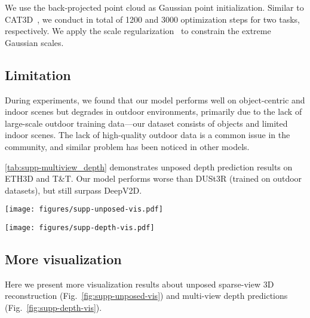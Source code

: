 We use the back-projected point cloud as Gaussian point initialization. Similar to CAT3D~\cite{gao2024cat3d}, we conduct in total of 1200 and 3000 optimization steps for two tasks, respectively. We apply the scale regularization~\cite{xie2024physgaussian} to constrain the extreme Gaussian scales.


\subsection{Limitation}

During experiments, we found that our model performs well on object-centric and indoor scenes but degrades in outdoor environments, primarily due to the lack of large-scale outdoor training data—our dataset consists of objects and limited indoor scenes. The lack of high-quality outdoor data is a common issue in the community, and similar problem has been noticed in other models.

\cref{tab:supp-multiview_depth} demonstrates unposed depth prediction results on ETH3D and T\&T. Our model performs worse than DUSt3R (trained on outdoor datasets), but still surpass DeepV2D.




\begin{figure*}[t]
    \centering
    \texttt{[image: figures/supp-unposed-vis.pdf]}
    \vspace{-6mm}
    \caption{More unposed sparse-view 3D reconstruction results. }
    \vspace{-4mm}
    \label{fig:supp-unposed-vis}
\end{figure*}

\begin{figure*}[t]
    \centering
    \texttt{[image: figures/supp-depth-vis.pdf]}
    \vspace{-6mm}
    \caption{Visualization of multi-view depth prediction results. }
    \vspace{-4mm}
    \label{fig:supp-depth-vis}
\end{figure*}

\subsection{More visualization}
Here we present more visualization results about unposed sparse-view 3D reconstruction (Fig.~\ref{fig:supp-unposed-vis}) and multi-view depth predictions (Fig.~\ref{fig:supp-depth-vis}).